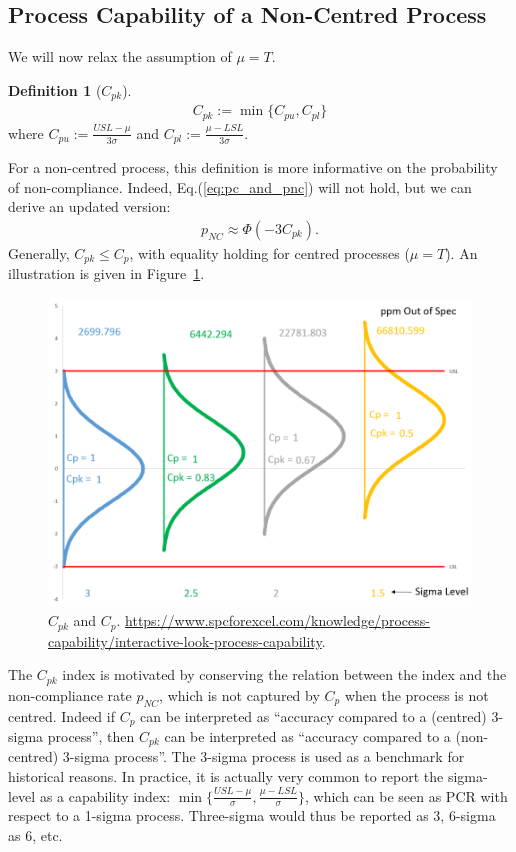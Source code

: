 \documentclass[12pt,a4paper]{report}
\theoremstyle{plain}
\theoremstyle{definition}
\newtheorem{definition}{Definition}
\newcommand{\set}[1]{\{ #1 \}} \newcommand{\setII}[1]{\left\{ #1 \right\}} \newcommand{\rv}[1]{\mathbf{#1}} \newcommand{\x}{\rv x} \newcommand{\y}{\rv y} \newcommand{\U}{\rv u} \newcommand{\T}{\rv t} \newcommand{\X}{\rv X} \newcommand{\Y}{\rv Y} \newcommand{\expect}[1]{\mathbf{E}\left[ #1 \right]} \newcommand{\expectg}[2]{\mathbf{E}_{\rv{#1}}\left[ \rv{#2} \right]} \newcommand{\expectn}[1]{\mathbb{E}\left[#1\right]} \newcommand{\cov}[1]{\mathbf{Cov} \left[ #1 \right]} \newcommand{\var}[1]{\mathop{Var} \left[ #1 \right]} \newcommand{\covn}[1]{\mathbb{Cov} \left[ #1 \right]} \newcommand{\gauss}[1]{\mathcal{N}\left(#1\right)} \newcommand{\cdf}[2]{F_{#1} (#2)} \newcommand{\survive}[2]{S_{#1} (#2)} \newcommand{\hazard}[2]{h_{#1} (#2)} \newcommand{\cuhazard}[2]{H_{#1} (#2)} \newcommand{\cdfn}[2]{\mathbb{F}_{#1}(#2)} \newcommand{\icdf}[2]{F_\rv{#1}^{-1} (#2)} \newcommand{\icdfn}[2]{\mathbb{F}^{-1}_{#1}(#2)} \newcommand{\pdf}[2]{p_{#1} (#2)} \newcommand{\prob}[1]{P\left( #1 \right)} \newcommand{\dist}{P} \newcommand{\density}{p}
\newcommand{\targetValue}{T}\newcommand{\cp}{C_p}\newcommand{\cpHat}{\hat{C}_p}\newcommand{\ctqExpect}{\mu}
\newcommand{\pnc}{p_{NC}}
\newcommand{\cpu}{C_{pu}}
\newcommand{\cpl}{C_{pl}}
\newcommand{\cpk}{C_{pk}}
\begin{document}
\subsection{Process Capability of a Non-Centred Process}
We will now relax the assumption of $\ctqExpect=\targetValue$.

\begin{definition}[$\cpk$]
\begin{align}
	\cpk:= \min\set{\cpu,\cpl}
\end{align}
where $\cpu:= \frac{USL- \ctqExpect}{3 \sigma}$ and $\cpl:= \frac{\ctqExpect-LSL}{3 \sigma}$.
\end{definition}
For a non-centred process, this definition is more informative on the probability of non-compliance.
Indeed, Eq.(\ref{eq:pc_and_pnc}) will not hold, but we can derive an updated version:
\begin{align}
	 \pnc \approx \Phi(-3 \cpk).
\end{align}
Generally, $\cpk \leq \cp$, with equality holding for centred processes ($\ctqExpect=\targetValue$).
An illustration is given in Figure~\ref{fig:cpk}.


\begin{figure}
\centering
\includegraphics[height=0.3\textheight]{art/Cpk_same_sigma_varying_avg}
\caption[$\cpk$ and $\cp$]{$\cpk$ and $\cp$. \newline
\url{https://www.spcforexcel.com/knowledge/process-capability/interactive-look-process-capability}.}
\label{fig:cpk}
\end{figure}



The $\cpk$ index is motivated by conserving the relation between the index and the non-compliance rate $\pnc$, which is not captured by $\cp$ when the process is not centred. 
Indeed if $\cp$ can be interpreted as ``accuracy compared to a (centred) 3-sigma process'', then $\cpk$ can be interpreted as ``accuracy compared to a (non-centred) 3-sigma process''.
The 3-sigma process is used as a benchmark for historical reasons. 
In practice, it is actually very common to report the sigma-level as a capability index: $\min\set{\frac{USL-\mu}{\sigma},\frac{\mu-LSL}{\sigma}}$, which can be seen as PCR with respect to a 1-sigma process.
Three-sigma would thus be reported as $3$, 6-sigma as $6$, etc.
\end{document}

